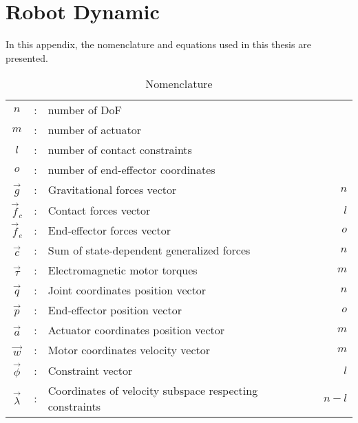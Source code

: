 \chapter{Robot Dynamic}
\label{sec:robotdynamic}

In this appendix, the nomenclature and equations used in this thesis are presented.

\begin{table}[htbp]
	\centering
	\caption{Nomenclature}	%
		\begin{tabular}{ c c l r }
        \hline \hline
			$n$             &  :  & number of DoF                                              & \\
			$m$             &  :  & number of actuator                                         & \\
			$l$             &  :  & number of contact constraints                              & \\
			$o$             &  :  & number of end-effector coordinates                         & \\ \hline \hline
			$\vec{g}$       &  :  & Gravitational forces vector                                & $n$  \\
			$\vec{f}_c$     &  :  & Contact forces vector                                      & $l$  \\
			$\vec{f}_e$     &  :  & End-effector forces vector                                 & $o$  \\
			$\vec{c}$       &  :  & Sum of state-dependent generalized forces                  & $n$  \\
			$\vec{\tau}$    &  :  & Electromagnetic motor torques                              & $m$  \\
			$\vec{q}$       &  :  & Joint coordinates position vector                          & $n$  \\
			$\vec{p}$       &  :  & End-effector position vector                               & $o$  \\
			$\vec{a}$       &  :  & Actuator coordinates position vector                       & $m$  \\
			$\vec{w}$       &  :  & Motor coordinates velocity vector                          & $m$  \\ 
			$\vec{\phi}$    &  :  & Constraint vector                                          & $l$  \\
			$\vec{\lambda}$ &  :  & Coordinates of velocity subspace respecting constraints    & $n-l$  \\\hline \hline

\end{tabular}
\end{table}
